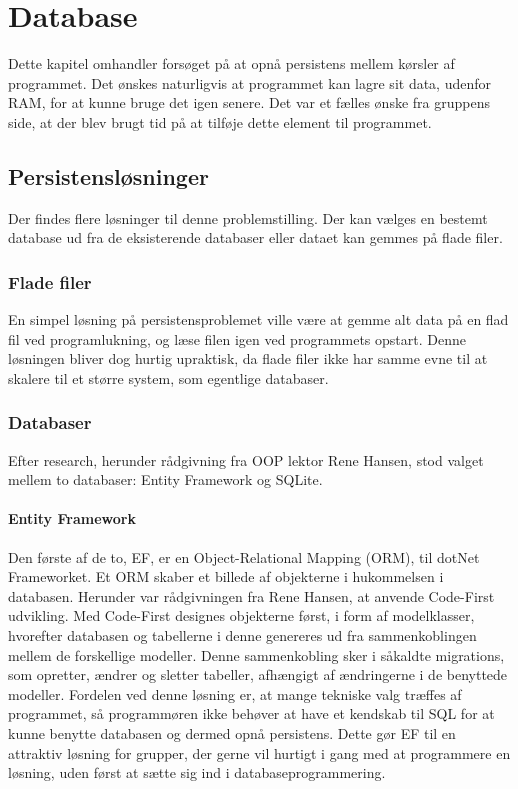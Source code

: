 \chapter{Database}\label{chap:database}

Dette kapitel omhandler forsøget på at opnå persistens mellem kørsler af programmet.
Det ønskes naturligvis at programmet kan lagre sit data, udenfor RAM, for at kunne bruge det igen senere. 
Det var et fælles ønske fra gruppens side, at der blev brugt tid på at tilføje dette element til programmet. 

\section{Persistensløsninger}

Der findes flere løsninger til denne problemstilling. 
Der kan vælges en bestemt database ud fra de eksisterende databaser eller dataet kan gemmes på flade filer.

\subsection{Flade filer}
En simpel løsning på persistensproblemet ville være at gemme alt data på en flad fil ved programlukning, og læse filen igen ved programmets opstart.
Denne løsningen bliver dog hurtig upraktisk, da flade filer ikke har samme evne til at skalere til et større system, som egentlige databaser.

\subsection{Databaser}
Efter research, herunder rådgivning fra OOP lektor Rene Hansen, stod valget mellem to databaser: Entity Framework og SQLite.

\subsubsection*{Entity Framework}
Den første af de to, \ac{EF}, er en Object-Relational Mapping (ORM), til dotNet Frameworket.
Et ORM skaber et billede af objekterne i hukommelsen i databasen. 
Herunder var rådgivningen fra Rene Hansen, at anvende Code-First udvikling.
Med Code-First designes objekterne først, i form af modelklasser, hvorefter databasen og tabellerne i denne genereres ud fra sammenkoblingen mellem de forskellige modeller. 
Denne sammenkobling sker i såkaldte migrations, som opretter, ændrer og sletter tabeller, afhængigt af ændringerne i de benyttede modeller.
Fordelen ved denne løsning er, at mange tekniske valg træffes af programmet, så programmøren ikke behøver at have et kendskab til \ac{SQL} for at kunne benytte databasen og dermed opnå persistens.
Dette gør \ac{EF} til en attraktiv løsning for grupper, der gerne vil hurtigt i gang med at programmere en løsning, uden først at sætte sig ind i databaseprogrammering.

